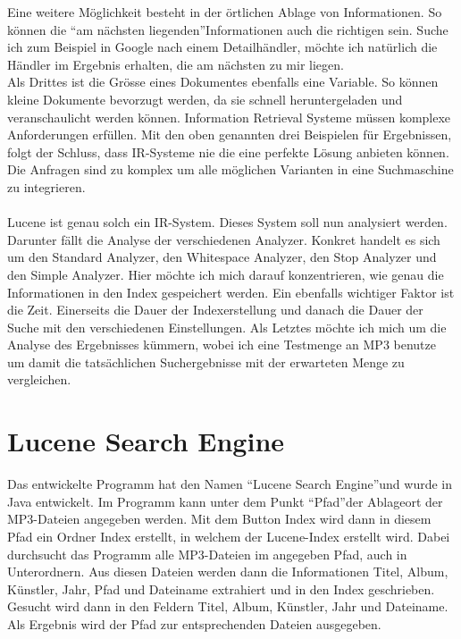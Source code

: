 \documentclass[12pt,a4paper,ngerman]{report}
\begin{document}
Eine weitere Möglichkeit besteht in der örtlichen Ablage von Informationen. So können die \textquotedblleft am nächsten liegenden\textquotedblright Informationen auch die richtigen sein. Suche ich zum Beispiel in Google nach einem Detailhändler, möchte ich natürlich die Händler im Ergebnis erhalten, die am nächsten zu mir liegen.\\
Als Drittes ist die Grösse eines Dokumentes ebenfalls eine Variable. So können kleine Dokumente bevorzugt werden, da sie schnell heruntergeladen und veranschaulicht werden können.
\newpage
Information Retrieval Systeme müssen komplexe Anforderungen erfüllen. Mit den oben genannten drei Beispielen für Ergebnissen, folgt der Schluss, dass IR-Systeme nie die eine perfekte Lösung anbieten können. Die Anfragen sind zu komplex um alle möglichen Varianten in eine Suchmaschine zu integrieren.\\
\\
Lucene ist genau solch ein IR-System. Dieses System soll nun analysiert werden. Darunter fällt die Analyse der verschiedenen Analyzer. Konkret handelt es sich um den Standard Analyzer, den Whitespace Analyzer, den Stop Analyzer und den Simple Analyzer. Hier möchte ich mich darauf konzentrieren, wie genau die Informationen in den Index gespeichert werden. Ein ebenfalls wichtiger Faktor ist die Zeit. Einerseits die Dauer der Indexerstellung und danach die Dauer der Suche mit den verschiedenen Einstellungen. Als Letztes möchte ich mich um die Analyse des Ergebnisses kümmern, wobei ich eine Testmenge an MP3 benutze um damit die tatsächlichen Suchergebnisse mit der erwarteten Menge zu vergleichen.
\section*{Lucene Search Engine}
Das entwickelte Programm hat den Namen \textquotedblleft Lucene Search Engine\textquotedblright und wurde in Java entwickelt. Im Programm kann unter dem Punkt \textquotedblleft Pfad\textquotedblright der Ablageort der MP3-Dateien angegeben werden. Mit dem Button Index wird dann in diesem Pfad ein Ordner Index erstellt, in welchem der Lucene-Index erstellt wird. Dabei durchsucht das Programm alle MP3-Dateien im angegeben Pfad, auch in Unterordnern. Aus diesen Dateien werden dann die Informationen Titel, Album, Künstler, Jahr, Pfad und Dateiname extrahiert und in den Index geschrieben. Gesucht wird dann in den Feldern Titel, Album, Künstler, Jahr und Dateiname. Als Ergebnis wird der Pfad zur entsprechenden Dateien ausgegeben.
\newpage
\end{document}
